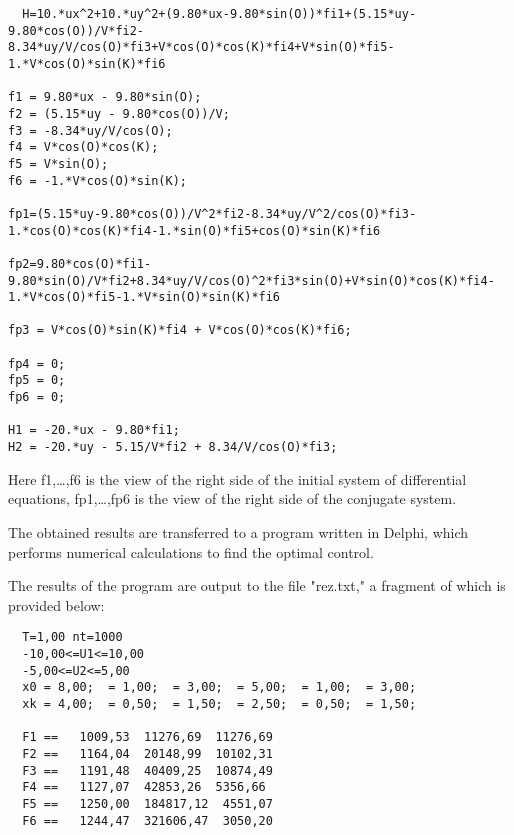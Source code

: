 \begin{lstlisting}
  H=10.*ux^2+10.*uy^2+(9.80*ux-9.80*sin(O))*fi1+(5.15*uy-9.80*cos(O))/V*fi2-8.34*uy/V/cos(O)*fi3+V*cos(O)*cos(K)*fi4+V*sin(O)*fi5-1.*V*cos(O)*sin(K)*fi6

f1 = 9.80*ux - 9.80*sin(O);
f2 = (5.15*uy - 9.80*cos(O))/V;
f3 = -8.34*uy/V/cos(O);
f4 = V*cos(O)*cos(K);
f5 = V*sin(O);
f6 = -1.*V*cos(O)*sin(K);

fp1=(5.15*uy-9.80*cos(O))/V^2*fi2-8.34*uy/V^2/cos(O)*fi3-1.*cos(O)*cos(K)*fi4-1.*sin(O)*fi5+cos(O)*sin(K)*fi6

fp2=9.80*cos(O)*fi1-9.80*sin(O)/V*fi2+8.34*uy/V/cos(O)^2*fi3*sin(O)+V*sin(O)*cos(K)*fi4-1.*V*cos(O)*fi5-1.*V*sin(O)*sin(K)*fi6

fp3 = V*cos(O)*sin(K)*fi4 + V*cos(O)*cos(K)*fi6;

fp4 = 0;
fp5 = 0;
fp6 = 0;

H1 = -20.*ux - 9.80*fi1;
H2 = -20.*uy - 5.15/V*fi2 + 8.34/V/cos(O)*fi3;

\end{lstlisting}

Here f1,\ldots,f6 is the view of the right side of the initial system of
differential equations, fp1,\ldots,fp6 is the view of the right side of
the conjugate system.

The obtained results are transferred to a program written in Delphi,
which performs numerical calculations to find the optimal control.

The results of the program are output to the file "rez.txt," a fragment
of which is provided below:

\begin{lstlisting}
  T=1,00 nt=1000
  -10,00<=U1<=10,00
  -5,00<=U2<=5,00
  x0 = 8,00;  = 1,00;  = 3,00;  = 5,00;  = 1,00;  = 3,00; 
  xk = 4,00;  = 0,50;  = 1,50;  = 2,50;  = 0,50;  = 1,50;
  
  F1 ==   1009,53  11276,69  11276,69
  F2 ==   1164,04  20148,99  10102,31
  F3 ==   1191,48  40409,25  10874,49
  F4 ==   1127,07  42853,26  5356,66
  F5 ==   1250,00  184817,12  4551,07
  F6 ==   1244,47  321606,47  3050,20
  
\end{lstlisting}

